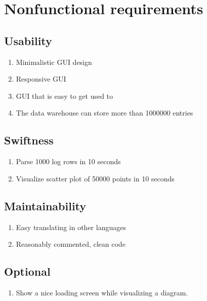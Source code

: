 \section{Nonfunctional requirements}

\renewcommand{\theenumi}{/N\arabic{enumi}0/}
\renewcommand{\labelenumi}{\theenumi}

 
\subsection{Usability}

\begin{enumerate}
  \item Minimalistic \gls{GUI} design
  \item Responsive \gls{GUI}
  \item \gls{GUI} that is easy to get used to
  \label{N1}
  \item The \gls{data warehouse} can store more than 1000000 entries
\end{enumerate}

\subsection{Swiftness}

\begin{enumerate}[resume] %
	\item Parse 1000 log \glspl{row} in 10 seconds
	
	\item Visualize \gls{scatter plot} of 50000 points in 10 seconds
\end{enumerate}

\subsection{Maintainability}

\begin{enumerate}[resume]
  \item Easy translating in other languages
  \item Reasonably commented, clean code
\end{enumerate}


\subsection{Optional}

\begin{enumerate}[resume]
  \item Show a nice loading screen while visualizing a \gls{diagram}. 
\end{enumerate}